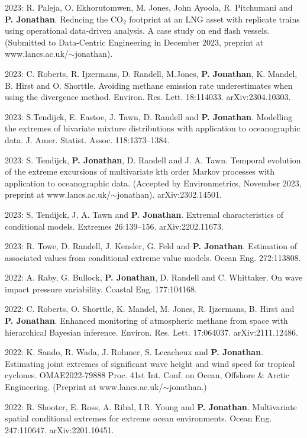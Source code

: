 \documentclass[11pt,a4paper]{moderncv}
\begin{document}
2023: R. Paleja, O. Ekhorutomwen, M. Jones, John Ayoola, R. Pitchumani and \textbf{P. Jonathan}. Reducing the CO$_2$ footprint at an LNG asset with replicate trains using operational data-driven analysis. A case study on end flash vessels. (Submitted to Data-Centric Engineering in December 2023, preprint at www.lancs.ac.uk/$\sim$jonathan).

2023: C. Roberts, R. Ijzermans, D. Randell, M.Jones, \textbf{P. Jonathan}, K. Mandel, B. Hirst and O. Shorttle. Avoiding methane emission rate underestimates when using the divergence method. Environ. Res. Lett. 18:114033. arXiv:2304.10303.

2023: S.Tendijck, E. Eastoe, J. Tawn, D. Randell and \textbf{P. Jonathan}. Modelling the extremes of bivariate mixture distributions with application to oceanographic data. J. Amer. Statist. Assoc. 118:1373--1384.

2023: S. Tendijck, \textbf{P. Jonathan}, D. Randell and J. A. Tawn. Temporal evolution of the extreme excursions of multivariate kth order Markov processes with application to oceanographic data. (Accepted by Environmetrics, November 2023, preprint at www.lancs.ac.uk/$\sim$jonathan). arXiv:2302.14501.

2023: S. Tendijck, J. A. Tawn and \textbf{P. Jonathan}. Extremal characteristics of conditional models. Extremes 26:139–156. arXiv:2202.11673.

2023: R. Towe, D. Randell, J. Kensler, G. Feld and \textbf{P. Jonathan}. Estimation of associated values from conditional extreme value models. Ocean Eng. 272:113808.

2022: A. Raby, G. Bullock, \textbf{P. Jonathan}, D. Randell and C. Whittaker. On wave impact pressure variability. Coastal Eng. 177:104168. 

2022: C. Roberts, O. Shorttle, K. Mandel, M. Jones, R. Ijzermans, B. Hirst and \textbf{P. Jonathan}. Enhanced monitoring of atmospheric methane from space with hierarchical Bayesian inference. Environ. Res. Lett. 17:064037. arXiv:2111.12486.

2022: K. Sando, R. Wada, J. Rohmer, S. Lecacheux and \textbf{P. Jonathan}. Estimating joint extremes of significant wave height and wind speed for tropical cyclones. OMAE2022-79888 Proc. 41st Int. Conf. on Ocean, Offshore \& Arctic Engineering. (Preprint at www.lancs.ac.uk/$\sim$jonathan.)

2022: R. Shooter, E. Ross, A. Ribal, I.R. Young and \textbf{P. Jonathan}. Multivariate spatial conditional extremes for extreme ocean environments. Ocean Eng. 247:110647. arXiv:2201.10451.
\end{document}
